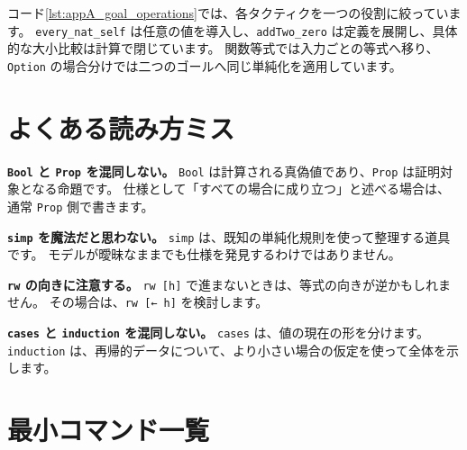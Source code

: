 コード\ref{lst:appA_goal_operations}では、各タクティクを一つの役割に絞っています。
\texttt{every\_nat\_self} は任意の値を導入し、\texttt{addTwo\_zero} は定義を展開し、具体的な大小比較は計算で閉じています。
関数等式では入力ごとの等式へ移り、\texttt{Option} の場合分けでは二つのゴールへ同じ単純化を適用しています。

\section{よくある読み方ミス}

\textbf{\texttt{Bool} と \texttt{Prop} を混同しない。}
\texttt{Bool} は計算される真偽値であり、\texttt{Prop} は証明対象となる命題です。
仕様として「すべての場合に成り立つ」と述べる場合は、通常 \texttt{Prop} 側で書きます。

\textbf{\texttt{simp} を魔法だと思わない。}
\texttt{simp} は、既知の単純化規則を使って整理する道具です。
モデルが曖昧なままでも仕様を発見するわけではありません。

\textbf{\texttt{rw} の向きに注意する。}
\texttt{rw [h]} で進まないときは、等式の向きが逆かもしれません。
その場合は、\texttt{rw [← h]} を検討します。

\textbf{\texttt{cases} と \texttt{induction} を混同しない。}
\texttt{cases} は、値の現在の形を分けます。
\texttt{induction} は、再帰的データについて、より小さい場合の仮定を使って全体を示します。

\section{最小コマンド一覧}

